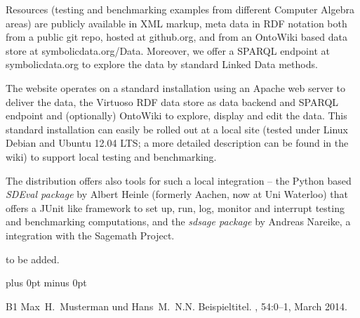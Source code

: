 \documentclass[a4paper,11pt]{article}
\begin{document}
\begin{multicols}{2}
Resources (testing and benchmarking examples from different Computer Algebra
areas) are publicly available in XML markup, meta data in RDF notation both
from a public git repo, hosted at github.org, and from an OntoWiki based data
store at symbolicdata.org/Data.  Moreover, we offer a SPARQL endpoint at
symbolicdata.org to explore the data by standard Linked Data methods.

The website operates on a standard installation using an Apache web server to
deliver the data, the Virtuoso RDF data store as data backend and SPARQL
endpoint and (optionally) OntoWiki to explore, display and edit the data.
This standard installation can easily be rolled out at a local site (tested
under Linux Debian and Ubuntu 12.04 LTS; a more detailed description can be
found in the {\SD} wiki) to support local testing and benchmarking. 

The distribution offers also tools for such a local integration -- the Python
based \emph{SDEval package} by Albert Heinle (formerly Aachen, now at Uni
Waterloo) that offers a JUnit like framework to set up, run, log, monitor and
interrupt testing and benchmarking computations, and the \emph{sdsage package}
by Andreas Nareike, a {\SD} integration with the Sagemath Project. 


to be added.


\begin{thebibliography}{1}
\itemsep=0cm plus 0pt minus 0pt

\bibitem
{B1}
Max~H.\ Musterman und Hans~M.\ N.N.
\newblock Beispieltitel.
, 54:0--1, March 2014.

\end{thebibliography}


\end{multicols}
\end{document}
